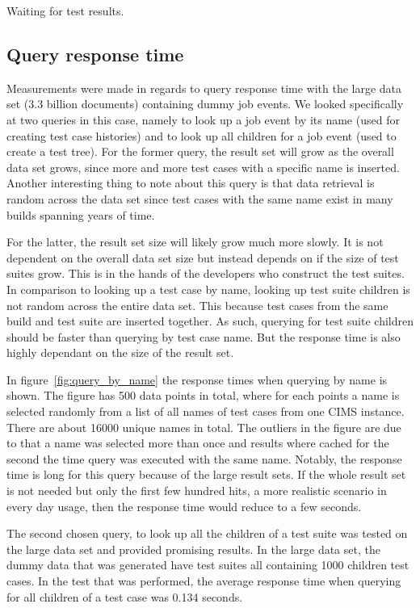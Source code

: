 
Waiting for test results.

\subsection{Query response time}
Measurements were made in regards to query response time with the large data set (3.3 billion documents) containing dummy job events. We looked specifically at two queries in this case, namely to look up a job event by its name (used for creating test case histories) and to look up all children for a job event (used to create a test tree). For the former query, the result set will grow as the overall data set grows, since more and more test cases with a specific name is inserted. Another interesting thing to note about this query is that data retrieval is random across the data set since test cases with the same name exist in many builds spanning years of time.

For the latter, the result set size will likely grow much more slowly. It is not dependent on the overall data set size but instead depends on if the size of test suites grow. This is in the hands of the developers who construct the test suites. In comparison to looking up a test case by name, looking up test suite children is not random across the entire data set. This because test cases from the same build and test suite are inserted together. As such, querying for test suite children should be faster than querying by test case name. But the response time is also highly dependant on the size of the result set.

In figure~\ref{fig:query_by_name} the response times when querying by name is shown. The figure has 500 data points in total, where for each points a name is selected randomly from a list of all names of test cases from one CIMS instance. There are about 16000 unique names in total. The outliers in the figure are due to that a name was selected more than once and results where cached for the second the time query was executed with the same name. Notably, the response time is long for this query because of the large result sets. If the whole result set is not needed but only the first few hundred hits, a more realistic scenario in every day usage, then the response time would reduce to a few seconds.

The second chosen query, to look up all the children of a test suite was tested on the large data set and provided promising results. In the large data set, the dummy data that was generated have test suites all containing 1000 children test cases. In the test that was performed, the average response time when querying for all children of a test case was 0.134 seconds.

